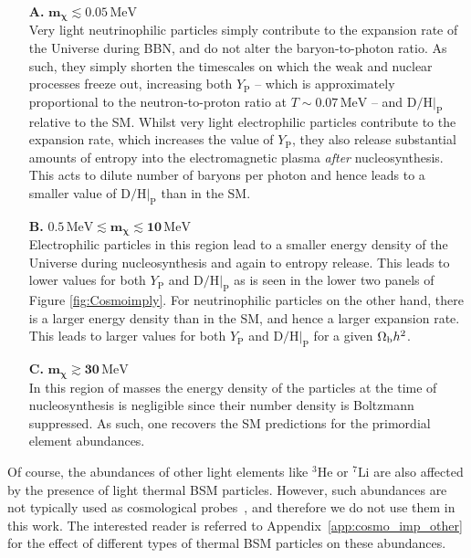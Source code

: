 \documentclass[notitlepage,letterpaper,natbib,aps,prd,onecolumn,amsmath,amsfonts,nofootinbib,preprintnumbers,superscriptaddress,secnumarabic,groupedaddress]{revtex4-1}
\begin{document}
\begin{enumerate}[leftmargin=0.7cm,itemsep=0pt]
    \item[\textbf{A.}] $\boldsymbol{m_\chi \lesssim 0.05 \, \mathrm{MeV}}$ \\ Very light neutrinophilic particles simply contribute to the expansion rate of the Universe during BBN, and do not alter the baryon-to-photon ratio. As such, they simply shorten the timescales on which the weak and nuclear processes freeze out, increasing both $Y_{\mathrm{P}}$ -- which is approximately proportional to the neutron-to-proton ratio at $T \sim 0.07 \, \mathrm{MeV}$ \cite{Sarkar:1995dd,Iocco:2008va,Pospelov:2010hj} -- and $\mathrm{D}/\mathrm{H}|_{\mathrm{P}}$ relative to the SM. Whilst very light electrophilic particles contribute to the expansion rate, which increases the value of $Y_{\mathrm{P}}$, they also release substantial amounts of entropy into the electromagnetic plasma \emph{after} nucleosynthesis. This acts to dilute number of baryons per photon and hence leads to a smaller value of $\mathrm{D}/\mathrm{H}|_{\mathrm{P}}$ than in the SM.
    
    \item[\textbf{B.}] $\boldsymbol{0.5 \, \mathrm{MeV} \lesssim m_\chi \lesssim 10 \, \mathrm{MeV}}$ \\ Electrophilic particles in this region lead to a smaller energy density of the Universe during nucleosynthesis and again to entropy release. This leads to lower values for both $Y_{\mathrm{P}}$ and $\mathrm{D}/\mathrm{H}|_{\mathrm{P}}$ as is seen in the lower two panels of Figure \ref{fig:Cosmoimply}. For neutrinophilic particles on the other hand, there is a larger energy density than in the SM, and hence a larger expansion rate. This leads to larger values for both $Y_{\mathrm{P}}$ and $\mathrm{D}/\mathrm{H}|_{\mathrm{P}}$ for a given $\Omega_{\rm b} h^2$.
    
    \item[\textbf{C.}] $\boldsymbol{m_\chi \gtrsim 30 \, \mathrm{MeV}}$ \\ In this region of masses the energy density of the particles at the time of nucleosynthesis is negligible since their number density is Boltzmann suppressed. As such, one recovers the SM predictions for the primordial element abundances.
\end{enumerate}

Of course, the abundances of other light elements like ${}^3\text{He}$ or ${}^{7}\text{Li}$ are also affected by the presence of light thermal BSM particles. However, such abundances are not typically used as cosmological probes~\cite{pdg}, and therefore we do not use them in this work. The interested reader is referred to Appendix~\ref{app:cosmo_imp_other} for the effect of different types of thermal BSM particles on these abundances. 
\end{document}
